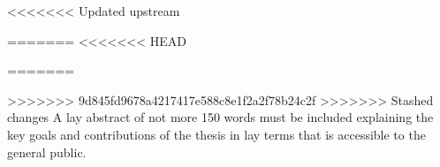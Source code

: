 <<<<<<< Updated upstream

=======
<<<<<<< HEAD

=======

>>>>>>> 9d845fd9678a4217417e588c8e1f2a2f78b24c2f
>>>>>>> Stashed changes
A lay abstract of not more 150 words must be included explaining the key goals and contributions of the thesis in lay terms that is accessible to the general public. 